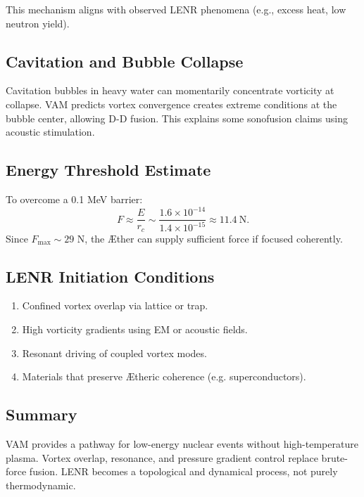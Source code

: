 This mechanism aligns with observed LENR phenomena (e.g., excess heat, low neutron yield).

\subsection{Cavitation and Bubble Collapse}
Cavitation bubbles in heavy water can momentarily concentrate vorticity at collapse. VAM predicts vortex convergence creates extreme conditions at the bubble center, allowing D-D fusion. This explains some sonofusion claims using acoustic stimulation.

\subsection{Energy Threshold Estimate}
To overcome a 0.1 MeV barrier:
\[
    F \approx \frac{E}{r_c} \sim \frac{1.6\times10^{-14}}{1.4\times10^{-15}} \approx 11.4~\text{N}.
\]
Since $F_{\max} \sim 29$ N, the Æther can supply sufficient force if focused coherently.

\subsection{LENR Initiation Conditions}
\begin{enumerate}
    \item Confined vortex overlap via lattice or trap.
    \item High vorticity gradients using EM or acoustic fields.
    \item Resonant driving of coupled vortex modes.
    \item Materials that preserve Ætheric coherence (e.g. superconductors).
\end{enumerate}

\subsection{Summary}
VAM provides a pathway for low-energy nuclear events without high-temperature plasma. Vortex overlap, resonance, and pressure gradient control replace brute-force fusion. LENR becomes a topological and dynamical process, not purely thermodynamic.